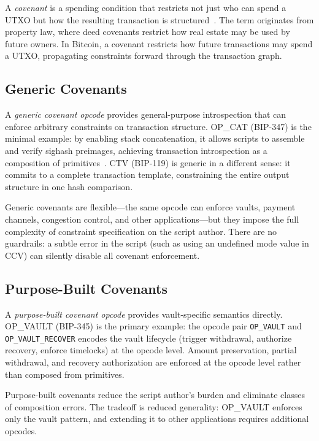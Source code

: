 A \emph{covenant} is a spending condition that restricts not just who can spend a UTXO
but how the resulting transaction is structured~\cite{MES16}. The term originates from
property law, where deed covenants restrict how real estate may be used by future owners.
In Bitcoin, a covenant restricts how future transactions may spend a UTXO, propagating
constraints forward through the transaction graph.

\subsection{Generic Covenants} \label{ss:generic}

A \emph{generic covenant opcode} provides general-purpose introspection that can enforce
arbitrary constraints on transaction structure. OP\_CAT (BIP-347) is the minimal example:
by enabling stack concatenation, it allows scripts to assemble and verify sighash
preimages, achieving transaction introspection as a composition of
primitives~\cite{Poe21}. CTV (BIP-119) is generic in a different sense: it commits to a
complete transaction template, constraining the entire output structure in one hash
comparison.

Generic covenants are flexible---the same opcode can enforce vaults, payment channels,
congestion control, and other applications---but they impose the full complexity of
constraint specification on the script author. There are no guardrails: a subtle error
in the script (such as using an undefined mode value in CCV) can silently disable all
covenant enforcement.

\subsection{Purpose-Built Covenants} \label{ss:purpose_built}

A \emph{purpose-built covenant opcode} provides vault-specific semantics directly. OP\_VAULT
(BIP-345) is the primary example: the opcode pair \texttt{OP\_VAULT} and
\texttt{OP\_VAULT\_RECOVER} encodes the vault lifecycle (trigger withdrawal, authorize
recovery, enforce timelocks) at the opcode level. Amount preservation, partial
withdrawal, and recovery authorization are enforced at the opcode level rather than
composed from primitives.

Purpose-built covenants reduce the script author's burden and eliminate classes of
composition errors. The tradeoff is reduced generality: OP\_VAULT enforces only the
vault pattern, and extending it to other applications requires additional opcodes.

